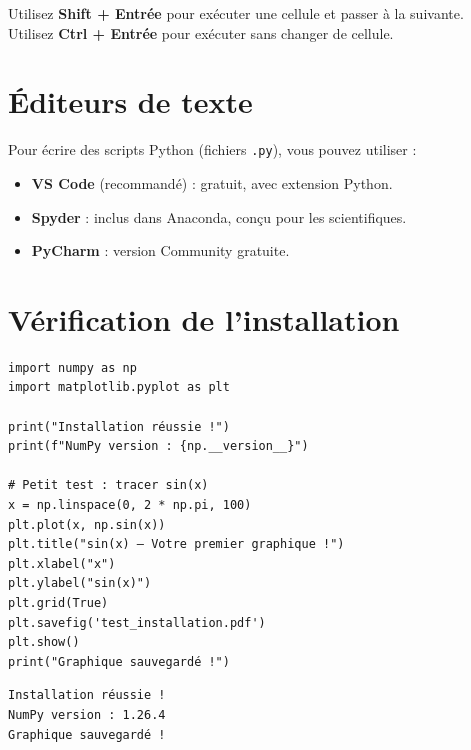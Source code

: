 \begin{bonnepratique}
Utilisez \textbf{Shift + Entr\'ee} pour ex\'ecuter une cellule et passer \`a la suivante. Utilisez \textbf{Ctrl + Entr\'ee} pour ex\'ecuter sans changer de cellule.
\end{bonnepratique}

\section*{\'Editeurs de texte}

Pour \'ecrire des scripts Python (fichiers \texttt{.py}), vous pouvez utiliser :
\begin{itemize}
\item \textbf{VS Code} (recommand\'e) : gratuit, avec extension Python.
\item \textbf{Spyder} : inclus dans Anaconda, con\c{c}u pour les scientifiques.
\item \textbf{PyCharm} : version Community gratuite.
\end{itemize}

\section*{V\'erification de l'installation}

\begin{codeblock}[title=\textbf{Python --- Premier test}]
\begin{verbatim}
import numpy as np
import matplotlib.pyplot as plt

print("Installation réussie !")
print(f"NumPy version : {np.__version__}")

# Petit test : tracer sin(x)
x = np.linspace(0, 2 * np.pi, 100)
plt.plot(x, np.sin(x))
plt.title("sin(x) — Votre premier graphique !")
plt.xlabel("x")
plt.ylabel("sin(x)")
plt.grid(True)
plt.savefig('test_installation.pdf')
plt.show()
print("Graphique sauvegardé !")
\end{verbatim}
\end{codeblock}

\begin{codeoutput}
\begin{verbatim}
Installation réussie !
NumPy version : 1.26.4
Graphique sauvegardé !
\end{verbatim}
\end{codeoutput}

